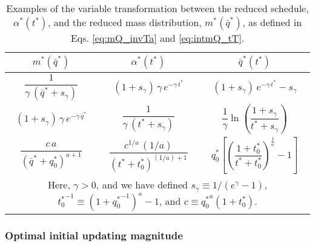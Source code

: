 \documentclass[reprint, superscriptaddress, floatfix]{revtex4-1}
\begin{document}
\begin{table}[h]
  \caption{\label{tab:m_and_a}
    Examples of the variable transformation between the
    reduced schedule, $\alpha^*(t^*)$,
    and the reduced mass distribution, $m^*(\bar q^*)$,
    as defined in Eqs. \eqref{eq:mQ_invTa}
    and \eqref{eq:intmQ_tT}.
  }
  \setlength{\tabcolsep}{3pt} %
  \renewcommand\arraystretch{2.0} %
  \begin{tabular} { c c c }
    \hline
    $m^*(\bar q^*)$ &
    $\alpha^*(t^*)$ &
    $\bar q^*(t^*)$
    \\
    \hline
    $\dfrac{1}{\gamma \, ({\bar q}^* + s_\gamma) }$ &
    $(1 + s_\gamma) \, \gamma \, e^{-\gamma \, t^*}$ &
    $(1 + s_\gamma) \, e^{-\gamma \, t^*} - s_\gamma$
    \\
    $(1+ s_\gamma) \, \gamma \, e^{-\gamma \, {\bar q}^*}$ &
    $\dfrac{1}{ \gamma \, (t^* + s_\gamma) }$ &
    $\dfrac{1}{\gamma} \ln\left(\dfrac{1 + s_\gamma}{t^* + s_\gamma} \right)$
    \\
    $\dfrac{c \, a}{\left( {\bar q}^* + q^*_0 \right)^{a+1}}$ &
    $\dfrac{c^{1/a} \, (1/a)}{\left( t^* + t^*_0 \right)^{(1/a)+1}}$ &
    $q^*_0 \left[\left( \dfrac{1+t^*_0}{t^* + t^*_0} \right)^{\frac 1 a} - 1\right]$
    \\
    \hline
    \multicolumn{3}{p{8cm}}{
    Here,
    $\gamma > 0$,
    and we have defined
    $s_\gamma \equiv 1/(e^\gamma - 1)$,
    ${t^*_0}^{-1} \equiv \left(1+{q^*_0}^{-1}\right)^a - 1$,
    and
    $c \equiv {q^*_0}^a(1 + t^*_0)$.
    } \\
    \hline
  \end{tabular}
\end{table}








\subsubsection{\label{sec:optinitalpha}
  Optimal initial updating magnitude
}
\end{document}
